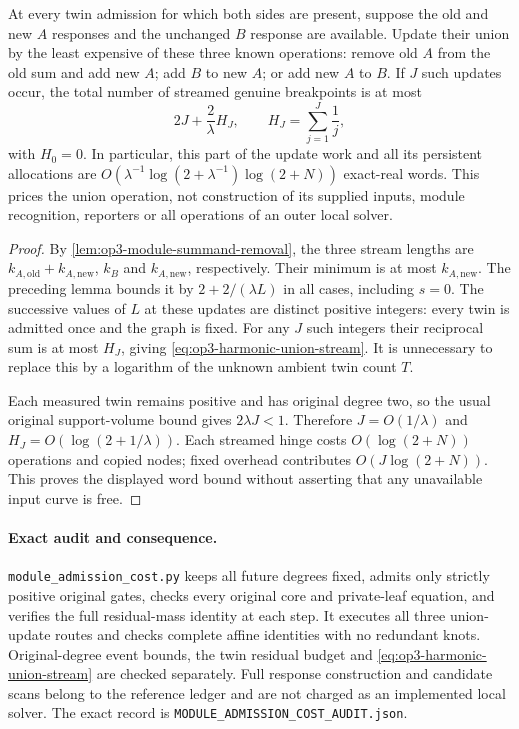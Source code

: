 \begin{proposition}
\label{prop:op3-harmonic-union-stream}
At every twin admission for which both sides are present, suppose the
old and new $A$ responses and the unchanged $B$ response are available.
Update their union by the least expensive of these three known operations:
remove old $A$ from the old sum and add new $A$; add $B$ to new $A$; or
add new $A$ to $B$. If $J$ such updates occur, the total number of streamed
genuine breakpoints is at most
\begin{equation}
 2J+\frac{2}{\lambda}H_J,
 \qquad H_J=\sum_{j=1}^J\frac1j,
 \label{eq:op3-harmonic-union-stream}
\end{equation}
with $H_0=0$. In particular, this part of the update work and all its
persistent allocations are
$O(\lambda^{-1}\log(2+\lambda^{-1})\log(2+N))$ exact-real words.
This prices the union operation, not construction of its supplied inputs,
module recognition, reporters or all operations of an outer local solver.
\end{proposition}
\begin{proof}
By \cref{lem:op3-module-summand-removal}, the three stream lengths are
$k_{A,\mathrm{old}}+k_{A,\mathrm{new}}$, $k_B$ and
$k_{A,\mathrm{new}}$, respectively. Their minimum is at most
$k_{A,\mathrm{new}}$. The preceding lemma bounds it by
$2+2/(\lambda L)$ in all cases, including $s=0$.
The successive values of $L$ at these updates are distinct positive
integers: every twin is admitted once and the graph is fixed. For any
$J$ such integers their reciprocal sum is at most $H_J$, giving
\cref{eq:op3-harmonic-union-stream}. It is unnecessary to replace this
by a logarithm of the unknown ambient twin count $T$.

Each measured twin remains positive and has original degree two, so the
usual original support-volume bound gives $2\lambda J<1$. Therefore
$J=O(1/\lambda)$ and $H_J=O(\log(2+1/\lambda))$.
Each streamed hinge costs $O(\log(2+N))$ operations and copied nodes;
fixed overhead contributes $O(J\log(2+N))$. This proves the displayed
word bound without asserting that any unavailable input curve is free.
\end{proof}

\paragraph{Exact audit and consequence.}
\texttt{module\_admission\_cost.py} keeps all future degrees fixed, admits
only strictly positive original gates, checks every original core and
private-leaf equation, and verifies the full residual-mass identity at
each step. It executes all three union-update routes and checks complete
affine identities with no redundant knots. Original-degree event bounds,
the twin residual budget and \cref{eq:op3-harmonic-union-stream} are checked
separately. Full response construction and candidate scans belong to the
reference ledger and are not charged as an implemented local solver.
The exact record is \texttt{MODULE\_ADMISSION\_COST\_AUDIT.json}.

